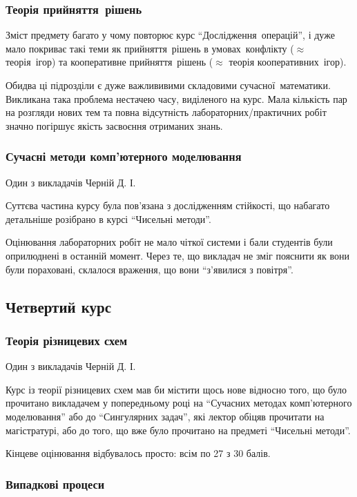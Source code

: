 \documentclass[14pt, a4paper]{extarticle}  %
\begin{document}
\subsubsection{Теорія прийняття~рішень}
Зміст предмету багато у чому повторює курс ``Дослідження~операцій'', і дуже мало покриває такі теми як прийняття~рішень в умовах~конфлікту ($\approx$ теорія~ігор) та кооперативне прийняття~рішень ($\approx$ теорія кооперативних~ігор). 

Обидва ці підрозділи є  дуже важлививими складовими сучасної~математики. Викликана така проблема нестачею часу, виділеного на курс. Мала кількість пар на розгляди нових тем та повна відсутність лабораторних/практичних робіт значно погіршує якість засвоєння отриманих знань. 

\subsubsection{Сучасні методи комп'ютерного моделювання}
Один з викладачів Черній Д. І.

Суттєва частина курсу була пов'язана з дослідженням стійкості, що набагато детальніше розібрано в курсі ``Чисельні методи''.

Оцінювання лабораторних робіт не мало чіткої системи і бали студентів були оприлюднені в останній момент. Через те, що  викладач не зміг пояснити як вони були пораховані, склалося враження, що вони ``з'явилися з повітря''. 

\subsection{Четвертий курс}
\subsubsection{Теорія різницевих схем} 
Один з викладачів Черній Д. І.

Курс із теорії різницевих схем мав би містити щось нове відносно того, що було прочитано викладачем у попередньому році на ``Сучасних методах комп'ютерного моделювання'' або до ``Сингулярних задач'', які лектор обіцяв прочитати на магістратурі, або до того, що вже було прочитано на предметі ``Чисельні методи''. 

Кінцеве оцінювання відбувалось просто: всім по 27 з 30 балів. 

\subsubsection{Випадкові процеси}
\end{document}
